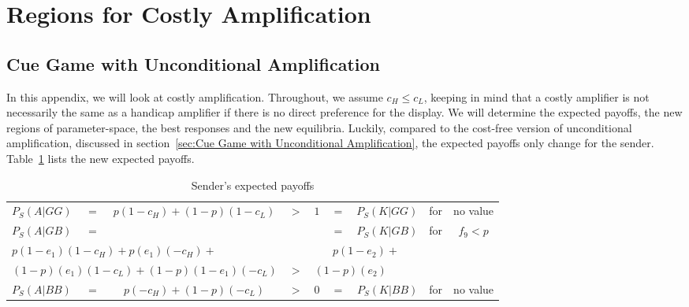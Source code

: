 \documentclass[a4paper,12pt]{article}
\numberwithin{equation}{section}
\begin{document}
\newpage \clearpage
{}

\label{sec:Bibliography}
\renewcommand{\refname}{Bibliography}




\newpage\clearpage
{}

\appendix

\section{Regions for Costly Amplification}
\label{sec:Regions for Costly Amplification}
\subsection{Cue Game with Unconditional Amplification}
\label{sec:Appendix/Cue Game with Unconditional Amplification}

In this appendix, we will look at costly amplification. Throughout, we assume $c_{H} \leq c_{L}$, keeping in mind that a costly amplifier is not necessarily the same as a handicap amplifier if there is no direct preference for the display. We will determine the expected payoffs, the new regions of parameter-space, the best responses and the new equilibria. Luckily, compared to the cost-free version of unconditional amplification, discussed in section~\ref{sec:Cue Game with Unconditional Amplification}, the expected payoffs only change for the sender. Table~\ref{tab:Appendix/Cue Game with Unconditional Amplification/ConditionalPayoffsS} lists the new expected payoffs.

\begin{table}[h]
\begin{center}
\begin{tabular}{lcccccrcc}
$P_{S}(A|GG)$ & $=$ & $p(1-c_{H})+(1-p)(1-c_{L})$ & $>$ & $1$ & $=$ & $P_{S}(K|GG)$ & for & no value\\
$P_{S}(A|GB)$ & $=$ & & & & $=$ & $P_{S}(K|GB)$ & \multirow{3}{*}{for} & \multirow{3}{*}{$f_{9}<p$}
\vspace{-1mm}\\
\multicolumn{3}{l}{$p(1-e_{1})(1-c_{H})+p(e_{1})(-c_{H})+$} & & \multicolumn{3}{c}{$p(1-e_{2})+$} 
\vspace{-1mm}\\
\multicolumn{3}{r}{$(1-p)(e_{1})(1-c_{L})+(1-p)(1-e_{1})(-c_{L})$} & $>$ & \multicolumn{3}{l}{$(1-p)(e_{2})$} 
\vspace{1mm}\\
$P_{S}(A|BB)$ & $=$ & $p(-c_{H})+(1-p)(-c_{L})$ & $>$ & $0$ & = & $P_{S}(K|BB)$ & for & no value
\end{tabular}
\end{center}
\caption{Sender's expected payoffs}
\label{tab:Appendix/Cue Game with Unconditional Amplification/ConditionalPayoffsS}
\end{table}
\end{document}
